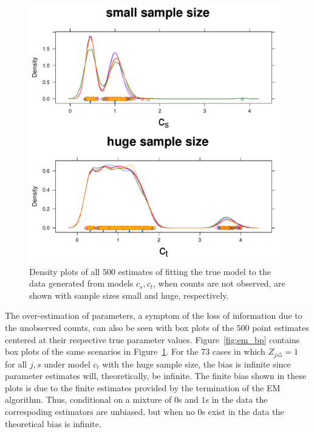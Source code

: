 \begin{figure}
  \centering
  \includegraphics[scale=0.5]{em}
  \caption{Density plots of all $500$ estimates of fitting the true model to the data generated from models $c_s,c_t$, when counts are not observed, are shown with sample sizes small and huge, respectively.}
  \label{fig:em}
\end{figure}

The over-estimation of parameters, a symptom of the loss of information due to the unobserved counts, can also be seen with box plots of the $500$ point estimates centered at their respective true parameter values.  Figure~\ref{fig:em_bp} contains box plots of the same scenarios in Figure~\ref{fig:em}.  For the $73$ cases in which $Z_{js5} = 1$ for all $j,s$ under model $c_t$ with the huge sample size, the bias is infinite since parameter estimates will, theoretically, be infinite.  The finite bias shown in these plots is due to the finite estimates provided by the termination of the EM algorithm.  Thus, conditional on a mixture of $0$s and $1$s in the data the correspoding estimators are unbiased, but when no $0$s exist in the data the theoretical bias is infinite.  

